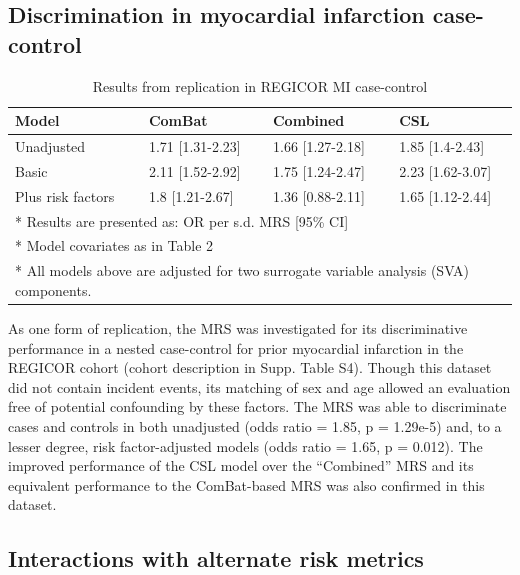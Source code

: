 \documentclass[]{article}
\begin{document}
\hypertarget{discrimination-in-myocardial-infarction-case-control}{%
\subsection{Discrimination in myocardial infarction
case-control}\label{discrimination-in-myocardial-infarction-case-control}}

\begin{table}[t]

\caption{\label{tab:regicor}Results from replication in REGICOR MI case-control}
\centering
\begin{tabular}{llll}
\toprule
Model & ComBat & Combined & CSL\\
\midrule
Unadjusted & 1.71 [1.31-2.23] & 1.66 [1.27-2.18] & 1.85 [1.4-2.43]\\
Basic & 2.11 [1.52-2.92] & 1.75 [1.24-2.47] & 2.23 [1.62-3.07]\\
Plus risk factors & 1.8 [1.21-2.67] & 1.36 [0.88-2.11] & 1.65 [1.12-2.44]\\
\bottomrule
\multicolumn{4}{l}{* Results are presented as: OR per s.d. MRS [95\% CI]}\\
\multicolumn{4}{l}{* Model covariates as in Table 2}\\
\multicolumn{4}{l}{* All models above are adjusted for two surrogate variable analysis (SVA) components.}\\
\end{tabular}
\end{table}

As one form of replication, the MRS was investigated for its
discriminative performance in a nested case-control for prior myocardial
infarction in the REGICOR cohort (cohort description in Supp. Table S4).
Though this dataset did not contain incident events, its matching of sex
and age allowed an evaluation free of potential confounding by these
factors. The MRS was able to discriminate cases and controls in both
unadjusted (odds ratio = 1.85, p = 1.29e-5) and, to a lesser degree,
risk factor-adjusted models (odds ratio = 1.65, p = 0.012). The improved
performance of the CSL model over the ``Combined'' MRS and its
equivalent performance to the ComBat-based MRS was also confirmed in
this dataset.

\hypertarget{interactions-with-alternate-risk-metrics}{%
\subsection{Interactions with alternate risk
metrics}\label{interactions-with-alternate-risk-metrics}}
\end{document}

